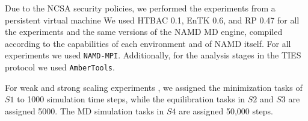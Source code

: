 



Due to the NCSA security policies, we performed the experiments from a
persistent virtual machine 
We used HTBAC 0.1, EnTK 0.6, and RP 0.47 for all the experiments and the same
versions of the NAMD MD engine, compiled according to the capabilities of
each environment and of NAMD itself. For all experiments we used
\texttt{NAMD-MPI}. Additionally, for the analysis stages in the TIES protocol
we used \texttt{AmberTools}.

For weak and strong scaling experiments , we
assigned the minimization tasks of $S1$ to 1000 simulation time steps, while
the equilibration tasks in $S2$ and $S3$ are  assigned 5000. The MD simulation tasks in $S4$ are
assigned 50,000 steps.  



